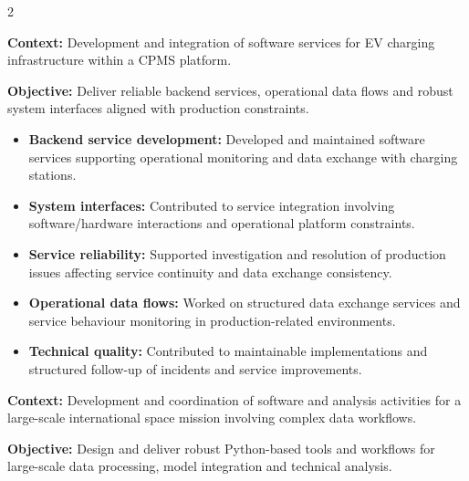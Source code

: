 \documentclass[8pt,a4paper,ragged2e,withhyper]{altacv}
\begin{document}
\begin{paracol}{2}


\textbf{Context:} Development and integration of software services for EV charging infrastructure within a CPMS platform.

\textbf{Objective:} Deliver reliable backend services, operational data flows and robust system interfaces aligned with production constraints.

\begin{itemize}
\item \textbf{Backend service development:} Developed and maintained software services supporting operational monitoring and data exchange with charging stations.
\item \textbf{System interfaces:} Contributed to service integration involving software/hardware interactions and operational platform constraints.
\item \textbf{Service reliability:} Supported investigation and resolution of production issues affecting service continuity and data exchange consistency.
\item \textbf{Operational data flows:} Worked on structured data exchange services and service behaviour monitoring in production-related environments.
\item \textbf{Technical quality:} Contributed to maintainable implementations and structured follow-up of incidents and service improvements.
\end{itemize}

\divider


\textbf{Context:} Development and coordination of software and analysis activities for a large-scale international space mission involving complex data workflows.

\textbf{Objective:} Design and deliver robust Python-based tools and workflows for large-scale data processing, model integration and technical analysis.


\end{paracol}
\end{document}

